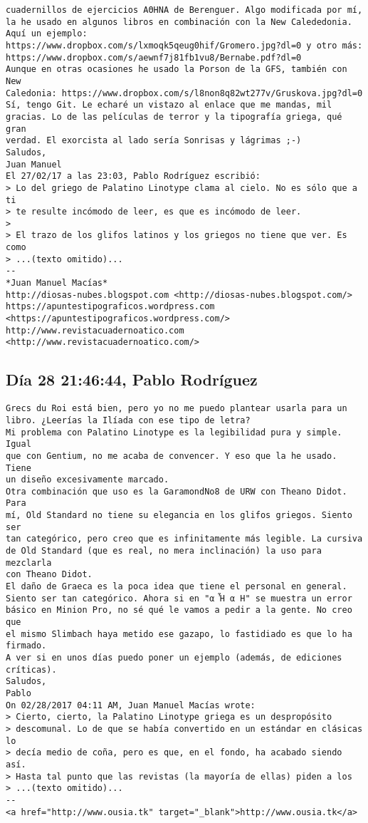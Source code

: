 \documentclass[a4paper,10pt]{article}
\begin{document}
\begin{lstlisting}
cuadernillos de ejercicios AΘΗΝΑ de Berenguer. Algo modificada por mí,
la he usado en algunos libros en combinación con la New Calededonia.
Aquí un ejemplo:
https://www.dropbox.com/s/lxmoqk5qeug0hif/Gromero.jpg?dl=0 y otro más:
https://www.dropbox.com/s/aewnf7j81fb1vu8/Bernabe.pdf?dl=0
Aunque en otras ocasiones he usado la Porson de la GFS, también con New
Caledonia: https://www.dropbox.com/s/l8non8q82wt277v/Gruskova.jpg?dl=0
Sí, tengo Git. Le echaré un vistazo al enlace que me mandas, mil
gracias. Lo de las películas de terror y la tipografía griega, qué gran
verdad. El exorcista al lado sería Sonrisas y lágrimas ;-)
Saludos,
Juan Manuel
El 27/02/17 a las 23:03, Pablo Rodríguez escribió:
> Lo del griego de Palatino Linotype clama al cielo. No es sólo que a ti
> te resulte incómodo de leer, es que es incómodo de leer.
>
> El trazo de los glifos latinos y los griegos no tiene que ver. Es como
> ...(texto omitido)...
-- 
*Juan Manuel Macías*
http://diosas-nubes.blogspot.com <http://diosas-nubes.blogspot.com/>
https://apuntestipograficos.wordpress.com
<https://apuntestipograficos.wordpress.com/>
http://www.revistacuadernoatico.com <http://www.revistacuadernoatico.com/>

\end{lstlisting}

\subsection{Día 28 21:46:44, Pablo Rodríguez}

\begin{lstlisting}
Grecs du Roi está bien, pero yo no me puedo plantear usarla para un
libro. ¿Leerías la Ilíada con ese tipo de letra?
Mi problema con Palatino Linotype es la legibilidad pura y simple. Igual
que con Gentium, no me acaba de convencer. Y eso que la he usado. Tiene
un diseño excesivamente marcado.
Otra combinación que uso es la GaramondNo8 de URW con Theano Didot. Para
mí, Old Standard no tiene su elegancia en los glifos griegos. Siento ser
tan categórico, pero creo que es infinitamente más legible. La cursiva
de Old Standard (que es real, no mera inclinación) la uso para mezclarla
con Theano Didot.
El daño de Graeca es la poca idea que tiene el personal en general.
Siento ser tan categórico. Ahora si en "α Ἦ α Η" se muestra un error
básico en Minion Pro, no sé qué le vamos a pedir a la gente. No creo que
el mismo Slimbach haya metido ese gazapo, lo fastidiado es que lo ha
firmado.
A ver si en unos días puedo poner un ejemplo (además, de ediciones
críticas).
Saludos,
Pablo
On 02/28/2017 04:11 AM, Juan Manuel Macías wrote:
> Cierto, cierto, la Palatino Linotype griega es un despropósito
> descomunal. Lo de que se había convertido en un estándar en clásicas lo
> decía medio de coña, pero es que, en el fondo, ha acabado siendo así.
> Hasta tal punto que las revistas (la mayoría de ellas) piden a los
> ...(texto omitido)...
-- 
<a href="http://www.ousia.tk" target="_blank">http://www.ousia.tk</a>

\end{lstlisting}
\end{document}
